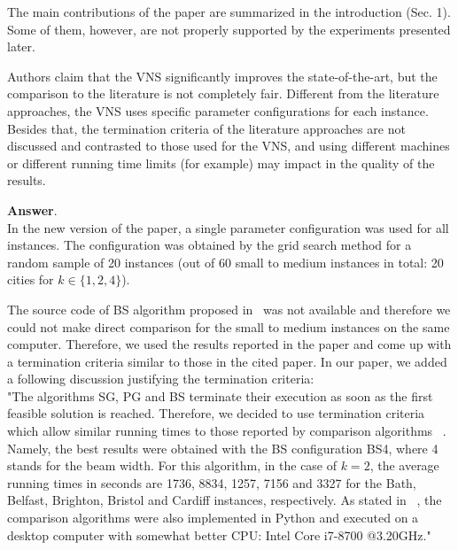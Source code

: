 \documentclass [11pt]{scrartcl}
\begin{document}
\begin{leftbar}
  
The main contributions of the paper are summarized in the introduction (Sec. 1). Some of them, however, are not properly supported by the experiments presented later.
\end{leftbar}
\begin{enumerate}
	\textbf{Answer}. \\
	In the new version of the paper, a single parameter configuration was used for all instances. The configuration was obtained by the grid search method for a random sample of 20 instances (out of 60 small to medium instances in total: 20 cities for $k \in \{1,2,4\}$).
	
	The source code of BS algorithm proposed in~\cite{corcoran2021heuristics} was not available and therefore we could not make direct comparison for the small to medium instances on the same computer. Therefore, we used the results reported in the paper and come up with a termination criteria similar to those in the cited paper. 
	In our paper, we added a following discussion justifying the termination criteria:\\
	
	"The algorithms SG, PG and BS terminate their execution as soon as the first feasible solution is reached. Therefore, we decided to use termination criteria which allow similar running times to those reported by comparison algorithms ~\cite{corcoran2021heuristics}. Namely, the best results were obtained with the BS configuration BS4, where 4 stands for the beam width. For this algorithm, in the case of $k=2$, the average running times in seconds are 1736, 8834, 1257, 7156 and 3327 for the Bath, Belfast, Brighton, Bristol and Cardiff instances, respectively. As stated in ~\cite{corcoran2021heuristics}, the comparison algorithms were also implemented in  Python and executed on a desktop computer with somewhat better CPU: Intel Core i7-8700 @3.20GHz."
	

\end{enumerate}
\end{document}
